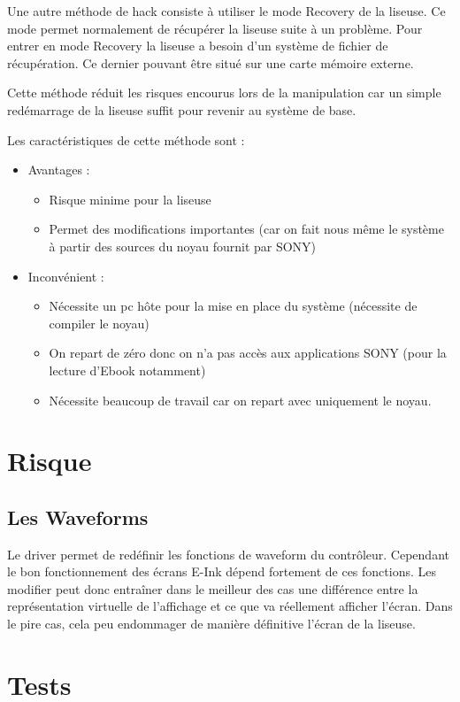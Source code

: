 Une autre méthode de hack consiste à utiliser le mode Recovery de la liseuse.
Ce mode permet normalement de récupérer la liseuse suite à un problème.
Pour entrer en mode Recovery la liseuse a besoin d'un système de fichier de récupération.
Ce dernier pouvant être situé sur une carte mémoire externe.

Cette méthode réduit les risques encourus lors de la manipulation car un simple redémarrage de la liseuse 
suffit pour revenir au système de base.

Les caractéristiques de cette méthode sont  : 
\begin{itemize}
	\renewcommand{\labelitemi}{$\bullet$}
	\item Avantages : 
	\begin{itemize}
		\item Risque minime pour la liseuse
		\item Permet des modifications importantes (car on fait nous même le système à partir des sources du noyau fournit par SONY)%
	\end{itemize}
	\item Inconvénient : 
		\begin{itemize}
			\item Nécessite un pc hôte pour la mise en place du système (nécessite de compiler le noyau)
			\item On repart de zéro donc on n'a pas accès aux applications SONY (pour la lecture d'Ebook notamment)
			\item Nécessite beaucoup de travail car on repart avec uniquement le noyau.
		\end{itemize}
\end{itemize}
\section{Risque}
\subsection{Les Waveforms}
	Le driver permet de redéfinir les fonctions de waveform du contrôleur.
Cependant le bon fonctionnement des écrans E-Ink dépend fortement de ces fonctions. Les modifier peut donc entraîner dans le meilleur des cas une différence entre la représentation virtuelle de l'affichage et ce que va réellement afficher l'écran. Dans le pire cas, cela peu endommager de manière définitive l'écran de la liseuse.

\section{Tests}

